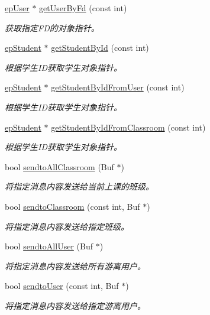 \begin{DoxyCompactItemize}
\hyperlink{classepUser}{ep\-User} $\ast$ \hyperlink{classepManager_a620725a2f06859bcb63ec6d19b5609a4}{get\-User\-By\-Fd} (const int)
\begin{DoxyCompactList}\small\item\em 获取指定\-F\-D的对象指针。 \end{DoxyCompactList}\item 
\hyperlink{classepStudent}{ep\-Student} $\ast$ \hyperlink{classepManager_abc79a463b70c1408aca98878bb0bfd0f}{get\-Student\-By\-Id} (const int)
\begin{DoxyCompactList}\small\item\em 根据学生\-I\-D获取学生对象指针。 \end{DoxyCompactList}\item 
\hyperlink{classepStudent}{ep\-Student} $\ast$ \hyperlink{classepManager_ac6d39aca07cc2027d44d716f64961d41}{get\-Student\-By\-Id\-From\-User} (const int)
\begin{DoxyCompactList}\small\item\em 根据学生\-I\-D获取学生对象指针。 \end{DoxyCompactList}\item 
\hyperlink{classepStudent}{ep\-Student} $\ast$ \hyperlink{classepManager_a37dfbc662308ff32fbb8b25b05e5acc9}{get\-Student\-By\-Id\-From\-Classroom} (const int)
\begin{DoxyCompactList}\small\item\em 根据学生\-I\-D获取学生对象指针。 \end{DoxyCompactList}\item 
bool \hyperlink{classepManager_aa6220b05aa643bdff030c1c79e90f8c8}{sendto\-All\-Classroom} (\-Buf $\ast$)
\begin{DoxyCompactList}\small\item\em 将指定消息内容发送给当前上课的班级。 \end{DoxyCompactList}\item 
bool \hyperlink{classepManager_a02637ea3d861ac89f3983f3bcb431150}{sendto\-Classroom} (const int, \-Buf $\ast$)
\begin{DoxyCompactList}\small\item\em 将指定消息内容发送给指定班级。 \end{DoxyCompactList}\item 
bool \hyperlink{classepManager_a048a1702141469676e28436ed37c46c3}{sendto\-All\-User} (\-Buf $\ast$)
\begin{DoxyCompactList}\small\item\em 将指定消息内容发送给所有游离用户。 \end{DoxyCompactList}\item 
bool \hyperlink{classepManager_a49c079c7f8762319c495f44be5b0de67}{sendto\-User} (const int, \-Buf $\ast$)
\begin{DoxyCompactList}\small\item\em 将指定消息内容发送给指定游离用户。 \end{DoxyCompactList}\end{DoxyCompactItemize}

